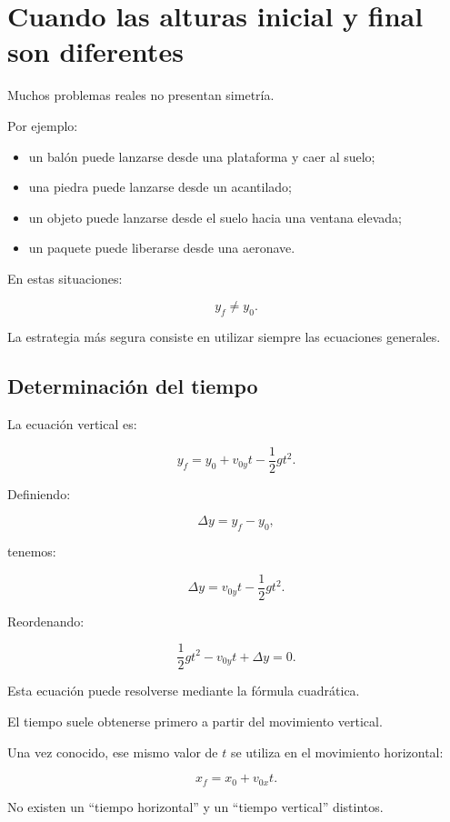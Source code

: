 \section{Cuando las alturas inicial y final son diferentes}

Muchos problemas reales no presentan simetría.

Por ejemplo:

\begin{itemize}
    \item un balón puede lanzarse desde una plataforma y caer al suelo;
    \item una piedra puede lanzarse desde un acantilado;
    \item un objeto puede lanzarse desde el suelo hacia una ventana elevada;
    \item un paquete puede liberarse desde una aeronave.
\end{itemize}

En estas situaciones:

\[
y_f\neq y_0.
\]

La estrategia más segura consiste en utilizar siempre las ecuaciones generales.


\subsection{Determinación del tiempo}

La ecuación vertical es:

\[
y_f
=
y_0
+
v_{0y}t
-
\frac{1}{2}gt^2.
\]

Definiendo:

\[
\Delta y=y_f-y_0,
\]

tenemos:

\[
\Delta y
=
v_{0y}t
-
\frac{1}{2}gt^2.
\]

Reordenando:

\[
\frac{1}{2}gt^2
-
v_{0y}t
+
\Delta y
=
0.
\]

Esta ecuación puede resolverse mediante la fórmula cuadrática.

\begin{interpretacion}
El tiempo suele obtenerse primero a partir del movimiento vertical.

Una vez conocido, ese mismo valor de \(t\) se utiliza en el movimiento horizontal:

\[
x_f=x_0+v_{0x}t.
\]

No existen un ``tiempo horizontal'' y un ``tiempo vertical'' distintos.
\end{interpretacion}


